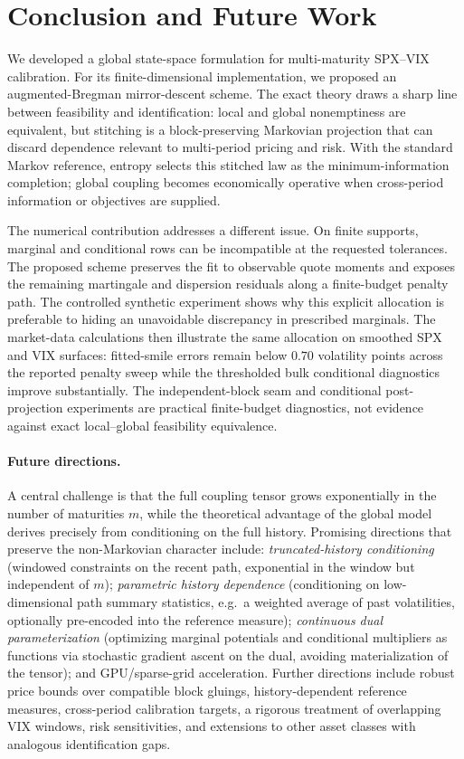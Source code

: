 \documentclass{article}
\begin{document}
\section{Conclusion and Future Work}\label{sec:conclusion}

We developed a global state-space formulation for multi-maturity SPX--VIX calibration.
For its finite-dimensional implementation, we proposed an augmented-Bregman mirror-descent scheme.
The exact theory draws a sharp line between feasibility and identification: local and global nonemptiness are equivalent, but stitching is a block-preserving Markovian projection that can discard dependence relevant to multi-period pricing and risk.
With the standard Markov reference, entropy selects this stitched law as the minimum-information completion; global coupling becomes economically operative when cross-period information or objectives are supplied.

The numerical contribution addresses a different issue.
On finite supports, marginal and conditional rows can be incompatible at the requested tolerances.
The proposed scheme preserves the fit to observable quote moments and exposes the remaining martingale and dispersion residuals along a finite-budget penalty path.
The controlled synthetic experiment shows why this explicit allocation is preferable to hiding an unavoidable discrepancy in prescribed marginals.
The market-data calculations then illustrate the same allocation on smoothed SPX and VIX surfaces: fitted-smile errors remain below $0.70$ volatility points across the reported penalty sweep while the thresholded bulk conditional diagnostics improve substantially.
The independent-block seam and conditional post-projection experiments are practical finite-budget diagnostics, not evidence against exact local--global feasibility equivalence.

\paragraph{Future directions.} A central challenge is that the full coupling tensor grows exponentially in the number of maturities $m$, while the theoretical advantage of the global model derives precisely from conditioning on the full history.
Promising directions that preserve the non-Markovian character include:
\emph{truncated-history conditioning} (windowed constraints on the recent path, exponential in the window but independent of $m$);
\emph{parametric history dependence} (conditioning on low-dimensional path summary statistics, e.g.\ a weighted average of past volatilities, optionally pre-encoded into the reference measure);
\emph{continuous dual parameterization} (optimizing marginal potentials and conditional multipliers as functions via stochastic gradient ascent on the dual, avoiding materialization of the tensor); and GPU/sparse-grid acceleration.
Further directions include robust price bounds over compatible block gluings, history-dependent reference measures, cross-period calibration targets, a rigorous treatment of overlapping VIX windows, risk sensitivities, and extensions to other asset classes with analogous identification gaps.
\end{document}
